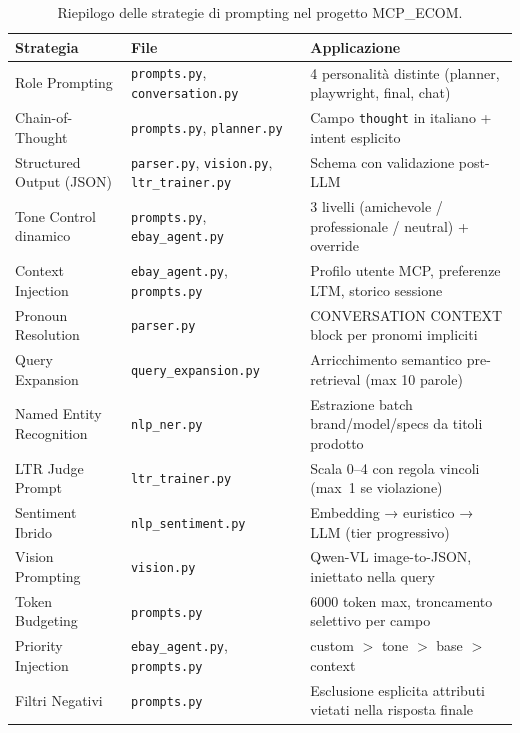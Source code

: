 \begin{table}[htbp]
\centering
\small
\begin{tabular}{p{4cm} p{4.5cm} p{5cm}}
\hline
\textbf{Strategia} & \textbf{File} & \textbf{Applicazione} \\
\hline
Role Prompting & \texttt{prompts.py}, \texttt{conversation.py} &
    4 personalità distinte (planner, playwright, final, chat) \\
\hline
Chain-of-Thought & \texttt{prompts.py}, \texttt{planner.py} &
    Campo \texttt{thought} in italiano + intent esplicito \\
\hline
Structured Output (JSON) & \texttt{parser.py}, \texttt{vision.py},
    \texttt{ltr\_trainer.py} &
    Schema con validazione post-LLM \\
\hline
Tone Control dinamico & \texttt{prompts.py}, \texttt{ebay\_agent.py} &
    3 livelli (amichevole / professionale / neutral) + override \\
\hline
Context Injection & \texttt{ebay\_agent.py}, \texttt{prompts.py} &
    Profilo utente MCP, preferenze LTM, storico sessione \\
\hline
Pronoun Resolution & \texttt{parser.py} &
    CONVERSATION CONTEXT block per pronomi impliciti \\
\hline
Query Expansion & \texttt{query\_expansion.py} &
    Arricchimento semantico pre-retrieval (max 10 parole) \\
\hline
Named Entity Recognition & \texttt{nlp\_ner.py} &
    Estrazione batch brand/model/specs da titoli prodotto \\
\hline
LTR Judge Prompt & \texttt{ltr\_trainer.py} &
    Scala 0–4 con regola vincoli (max~1 se violazione) \\
\hline
Sentiment Ibrido & \texttt{nlp\_sentiment.py} &
    Embedding → euristico → LLM (tier progressivo) \\
\hline
Vision Prompting & \texttt{vision.py} &
    Qwen-VL image-to-JSON, iniettato nella query \\
\hline
Token Budgeting & \texttt{prompts.py} &
    6000 token max, troncamento selettivo per campo \\
\hline
Priority Injection & \texttt{ebay\_agent.py}, \texttt{prompts.py} &
    custom $>$ tone $>$ base $>$ context \\
\hline
Filtri Negativi & \texttt{prompts.py} &
    Esclusione esplicita attributi vietati nella risposta finale \\
\hline
\end{tabular}
\caption{Riepilogo delle strategie di prompting nel progetto MCP\_ECOM.}
\label{tab:prompt-strategies}
\end{table}

